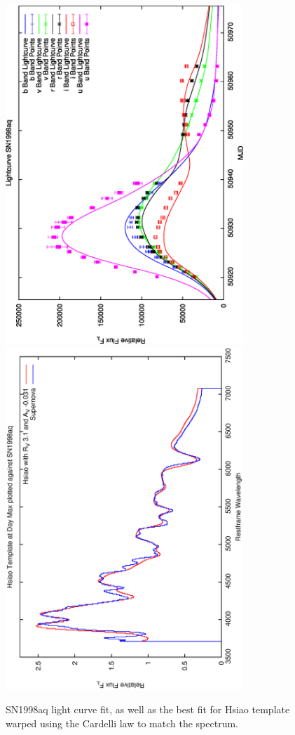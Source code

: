 \clearpage

\begin{figure}[p]
\centering
\includegraphics[angle=-90,width=0.8\textwidth]{./figures/ltcv/SN1998aq_v027_lightcurve.ps}
\hfill
\includegraphics[angle=-90,width=0.8\textwidth]{./figures/hsiao/SN1998aq_v001_hsiao.ps}
\hfill
\caption{SN1998aq light curve fit, as well as the best fit for Hsiao template warped using the Cardelli law to match the spectrum.}
\label{fig:SN1998aqfour2}
\end{figure}

